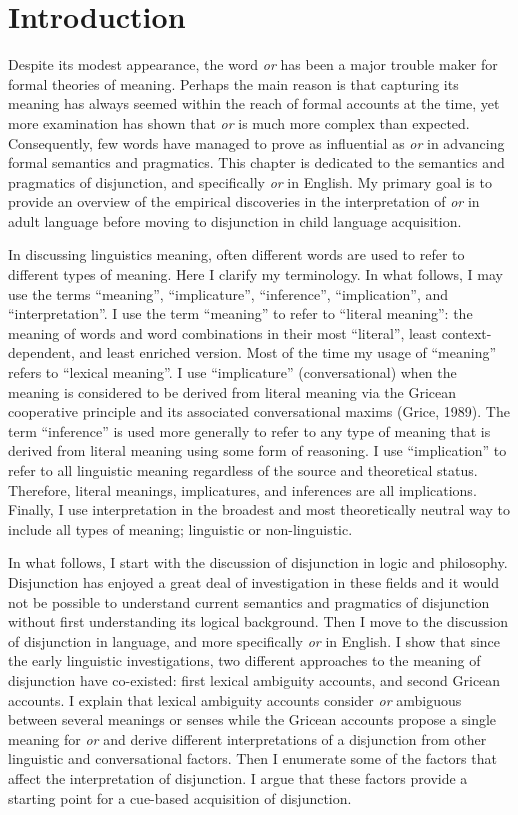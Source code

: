 \documentclass[oneside]{report}
\theoremstyle{definition}
\theoremstyle{definition}
\theoremstyle{definition}
\theoremstyle{remark}
\begin{document}
\section{Introduction}\label{introduction-1}

Despite its modest appearance, the word \emph{or} has been a major
trouble maker for formal theories of meaning. Perhaps the main reason is
that capturing its meaning has always seemed within the reach of formal
accounts at the time, yet more examination has shown that \emph{or} is
much more complex than expected. Consequently, few words have managed to
prove as influential as \emph{or} in advancing formal semantics and
pragmatics. This chapter is dedicated to the semantics and pragmatics of
disjunction, and specifically \emph{or} in English. My primary goal is
to provide an overview of the empirical discoveries in the
interpretation of \emph{or} in adult language before moving to
disjunction in child language acquisition.

In discussing linguistics meaning, often different words are used to
refer to different types of meaning. Here I clarify my terminology. In
what follows, I may use the terms ``meaning'', ``implicature'',
``inference'', ``implication'', and ``interpretation''. I use the term
``meaning'' to refer to ``literal meaning'': the meaning of words and
word combinations in their most ``literal'', least context-dependent,
and least enriched version. Most of the time my usage of ``meaning''
refers to ``lexical meaning''. I use ``implicature'' (conversational)
when the meaning is considered to be derived from literal meaning via
the Gricean cooperative principle and its associated conversational
maxims (Grice, 1989). The term ``inference'' is used more generally to
refer to any type of meaning that is derived from literal meaning using
some form of reasoning. I use ``implication'' to refer to all linguistic
meaning regardless of the source and theoretical status. Therefore,
literal meanings, implicatures, and inferences are all implications.
Finally, I use interpretation in the broadest and most theoretically
neutral way to include all types of meaning; linguistic or
non-linguistic.

In what follows, I start with the discussion of disjunction in logic and
philosophy. Disjunction has enjoyed a great deal of investigation in
these fields and it would not be possible to understand current
semantics and pragmatics of disjunction without first understanding its
logical background. Then I move to the discussion of disjunction in
language, and more specifically \emph{or} in English. I show that since
the early linguistic investigations, two different approaches to the
meaning of disjunction have co-existed: first lexical ambiguity
accounts, and second Gricean accounts. I explain that lexical ambiguity
accounts consider \emph{or} ambiguous between several meanings or senses
while the Gricean accounts propose a single meaning for \emph{or} and
derive different interpretations of a disjunction from other linguistic
and conversational factors. Then I enumerate some of the factors that
affect the interpretation of disjunction. I argue that these factors
provide a starting point for a cue-based acquisition of disjunction.
\end{document}
